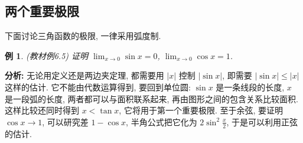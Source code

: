 \documentclass[UTF8,openany]{ctexbook}
\theoremstyle{chinesetextbook}
\newtheorem{example}{例}[section]
\begin{document}
\subsection{两个重要极限}
下面讨论三角函数的极限, 一律采用弧度制.
\begin{example}
\textnormal{(教材例6.5)} 证明 $\displaystyle\lim_{x\to0}\sin x=0$, $\displaystyle\lim_{x\to0}\cos x=1$.
\end{example}
\par\indent\textbf{分析:} 无论用定义还是两边夹定理, 都需要用 $|x|$ 控制 $|\sin x|$, 即需要 $|\sin x|\le|x|$ 这样的估计. 它不能由代数运算得到, 要回到单位圆: $\sin x$ 是一条线段的长度, $x$ 是一段弧的长度, 两者都可以与面积联系起来, 再由图形之间的包含关系比较面积. 这样比较还同时得到 $x<\tan x$, 它将用于第一个重要极限. 至于余弦, 要证明 $\cos x\to1$, 可以研究差 $1-\cos x$, 半角公式把它化为 $\displaystyle2\sin^2\frac x2$, 于是可以利用正弦的估计.
\end{document}
